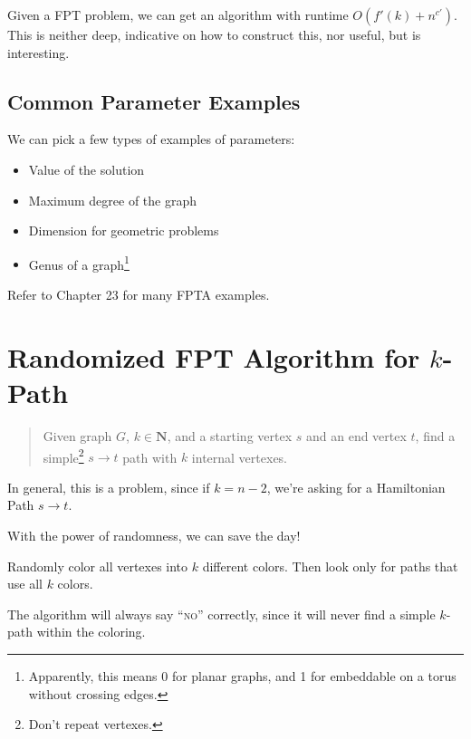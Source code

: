                 Given a FPT problem, we can get an algorithm with runtime $O(f'(k) + n^{c'})$.
                This is neither deep, indicative on how to construct this, nor useful, but is interesting.

                \subsection{Common Parameter Examples} %
                \label{sub:common_parameter_examples}
                    We can pick a few types of examples of parameters:
                    \begin{itemize}
                        \item Value of the \opt solution
                        \item Maximum degree of the graph
                        \item Dimension for geometric problems
                        \item Genus of a graph\footnote{Apparently, this means 0 for planar graphs, and 1 for embeddable on a torus without crossing edges.}
                    \end{itemize}
                    Refer to Chapter 23 for many FPTA examples.
            \section{Randomized FPT Algorithm for $k$-Path} %
            \label{sec:randomized_fpt_algorithm_for_k_path}
                \begin{quotation}
                    Given graph $G$, $k \in \mathbf{N}$, and a starting vertex $s$ and an end vertex $t$, find a simple\footnote{Don't repeat vertexes.} $s \to t$ path with $k$ internal vertexes.
                \end{quotation}
                In general, this is a \nphard problem, since if $k = n-2$, we're asking for a Hamiltonian Path $s \to t$.

                With the power of randomness, we can save the day!

                Randomly color all vertexes into $k$ different colors.
                Then look only for paths that use all $k$ colors.

                The algorithm will always say ``\textsc{no}'' correctly, since it will never find a simple $k$-path within the coloring.

